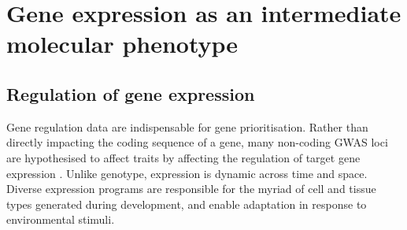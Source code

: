 %

\section{Gene expression as an intermediate molecular phenotype}

\subsection{Regulation of gene expression}

Gene regulation data are indispensable for gene prioritisation. 
Rather than directly impacting the coding sequence of a gene, 
many non-coding \gls{GWAS} loci are hypothesised to affect traits by affecting the regulation of target gene expression \autocite{gallagher2018PostGWASEraAssociation,cano-gamez2020GWASFunctionUsing}.
Unlike genotype, expression is dynamic across time and space.
Diverse expression programs are responsible for the myriad of cell and tissue types generated during development,
and enable adaptation in response to environmental stimuli.

